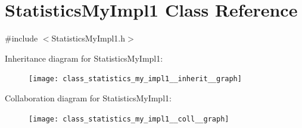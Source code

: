 \hypertarget{class_statistics_my_impl1}{\section{Statistics\-My\-Impl1 Class Reference}
\label{class_statistics_my_impl1}
}


{\ttfamily \#include $<$Statistics\-My\-Impl1.\-h$>$}



Inheritance diagram for Statistics\-My\-Impl1\-:\nopagebreak
\begin{figure}[H]
\begin{center}
\leavevmode
\texttt{[image: class\_statistics\_my\_impl1\_\_inherit\_\_graph]}
\end{center}
\end{figure}


Collaboration diagram for Statistics\-My\-Impl1\-:\nopagebreak
\begin{figure}[H]
\begin{center}
\leavevmode
\texttt{[image: class\_statistics\_my\_impl1\_\_coll\_\_graph]}
\end{center}
\end{figure}

